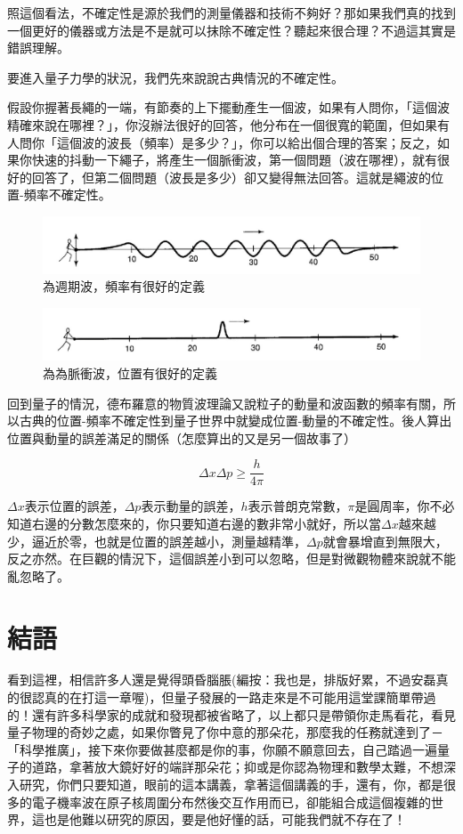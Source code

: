 照這個看法，不確定性是源於我們的測量儀器和技術不夠好？那如果我們真的找到一個更好的儀器或方法是不是就可以抹除不確定性？聽起來很合理？不過這其實是錯誤理解。

要進入量子力學的狀況，我們先來說說古典情況的不確定性。

假設你握著長繩的一端，有節奏的上下擺動產生一個波，如果有人問你，「這個波精確來說在哪裡？」，你沒辦法很好的回答，他分布在一個很寬的範圍，但如果有人問你「這個波的波長（頻率）是多少？」，你可以給出個合理的答案；反之，如果你快速的抖動一下繩子，將產生一個脈衝波，第一個問題（波在哪裡），就有很好的回答了，但第二個問題（波長是多少）卻又變得無法回答。這就是繩波的位置-頻率不確定性。
\begin{figure}[H]
\centering
\graphicspath{{physics/}}
\includegraphics[width=\linewidth]{periodic-wave.jpg}
\caption{為週期波，頻率有很好的定義}
\label{fig:periodic-wave}
\end{figure}

\begin{figure}[H]
\centering
\graphicspath{{physics/}}
\includegraphics[width=\linewidth]{pulse-wave.jpg}
\caption{為為脈衝波，位置有很好的定義}
\label{fig:pulse-wave}
\end{figure}
回到量子的情況，德布羅意的物質波理論又說粒子的動量和波函數的頻率有關，所以古典的位置-頻率不確定性到量子世界中就變成位置-動量的不確定性。後人算出位置與動量的誤差滿足的關係（怎麼算出的又是另一個故事了）

$$
\Delta x \Delta p \geq \frac{h}{4 \pi}
$$

$\Delta x$表示位置的誤差，$\Delta p$表示動量的誤差，$h$表示普朗克常數，$\pi$是圓周率，你不必知道右邊的分數怎麼來的，你只要知道右邊的數非常小就好，所以當$\Delta x$越來越少，逼近於零，也就是位置的誤差越小，測量越精準，$\Delta p$就會暴增直到無限大，反之亦然。在巨觀的情況下，這個誤差小到可以忽略，但是對微觀物體來說就不能亂忽略了。

\section{結語} \label{justin-reflection}
看到這裡，相信許多人還是覺得頭昏腦脹(編按：我也是，排版好累，不過安磊真的很認真的在打這一章喔)，但量子發展的一路走來是不可能用這堂課簡單帶過的！還有許多科學家的成就和發現都被省略了，以上都只是帶領你走馬看花，看見量子物理的奇妙之處，如果你瞥見了你中意的那朵花，那麼我的任務就達到了－「科學推廣」，接下來你要做甚麼都是你的事，你願不願意回去，自己踏過一遍量子的道路，拿著放大鏡好好的端詳那朵花；抑或是你認為物理和數學太難，不想深入研究，你們只要知道，眼前的這本講義，拿著這個講義的手，還有，你，都是很多的電子機率波在原子核周圍分布然後交互作用而已，卻能組合成這個複雜的世界，這也是他難以研究的原因，要是他好懂的話，可能我們就不存在了！
	
